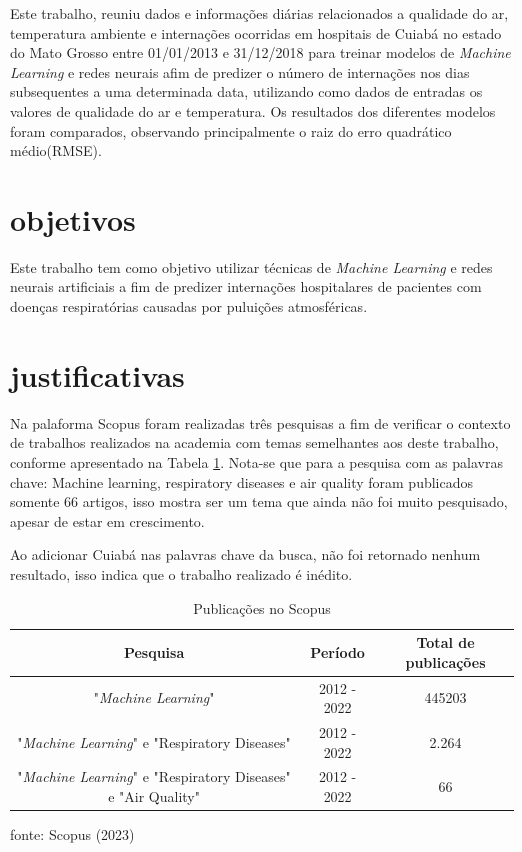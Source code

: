 \documentclass[
  12pt,		%
  a4paper,	%
  openright,%
  oneside,	%
  chapter=TITLE,		%
  section=TITLE,		%
  english,	%
  french,	%
  spanish,	%
  brazil	%
]{abntex2}
\begin{document}
    Este trabalho, reuniu dados e informações diárias relacionados a qualidade do ar, temperatura ambiente e internações ocorridas em hospitais
    de Cuiabá no estado do Mato Grosso entre 01/01/2013 e 31/12/2018 para treinar modelos de \textit{Machine Learning} e redes neurais afim de predizer
    o número de internações nos dias subsequentes a uma determinada data, utilizando como dados de entradas os valores de qualidade do ar
    e temperatura. Os resultados dos diferentes modelos foram comparados, observando principalmente o raiz do erro quadrático médio(RMSE).
    
    \section{objetivos}
    Este trabalho tem como objetivo utilizar técnicas de \textit{Machine Learning} e redes neurais artificiais a fim de predizer 
    internações hospitalares de pacientes com doenças respiratórias
    causadas por puluições atmosféricas.
    \section{justificativas}
    Na palaforma Scopus foram realizadas três pesquisas a fim de verificar o contexto de trabalhos
    realizados na academia com temas semelhantes aos deste trabalho, conforme apresentado na Tabela \ref*{tabela scopus}.
    Nota-se que para a pesquisa com as palavras chave: Machine learning, respiratory diseases e air quality 
    foram publicados somente 66 artigos, isso mostra ser um tema que ainda não foi muito pesquisado, apesar de estar em crescimento.

    Ao adicionar Cuiabá nas palavras chave da busca, não foi retornado nenhum resultado, isso indica que o trabalho realizado é inédito.

    \begin{table}[h]
        \centering
        \caption{Publicações no Scopus}
        \label{tabela scopus}
        \begin{tabular}{ccc}
            \hline
            \multicolumn{1}{|c|}{Pesquisa} & \multicolumn{1}{c|}{Período} & \multicolumn{1}{c|}{Total de publicações}\\
            \hline
            "\textit{Machine Learning}" & 2012 - 2022 & 445203 \\
            "\textit{Machine Learning}" e "Respiratory Diseases" & 2012 - 2022 & 2.264 \\
            "\textit{Machine Learning}" e "Respiratory Diseases"  e "Air Quality" & 2012 - 2022 & 66 \\
            \hline
        \end{tabular}
        \par
        {\small fonte: Scopus (2023)}
    \end{table}
\end{document}
